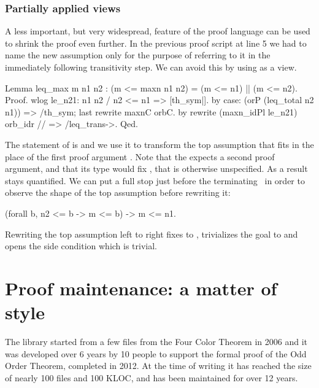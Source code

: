 \subsubsection{Partially applied views}

A less important, but very widespread, feature of the \mcbSSR{}
proof language can be used to shrink the proof even further.
In the previous proof script at line 5 we had to name 
the new assumption only for the
purpose of referring to it in the immediately following transitivity step.
We can avoid this by using  as a view.


\begin{coq}{}{}
Lemma leq_max m n1 n2 : (m <= maxn n1 n2) = (m <= n1) || (m <= n2).
Proof.
wlog le_n21: n1 n2 / n2 <= n1 => [th_sym|].
  by case: (orP (leq_total n2 n1)) => /th_sym; last rewrite maxnC orbC.
by rewrite (maxn_idPl le_n21) orb_idr // => /leq_trans->.
Qed.
\end{coq}

The statement of
 is  and
we use it to transform the top assumption  that fits in
the place of the first proof argument .  Note that
the  expects a second proof argument, and that its type
would fix , that is otherwise unspecified. As a result 
stays quantified. We can put a
full stop just before the terminating~ \C{->} in order to observe the shape of
the top assumption before rewriting it:

\begin{coq}{}{}
(forall b, n2 <= b -> m <= b) -> m <= n1.
\end{coq}

Rewriting the top assumption left to right fixes  to , trivializes
the goal  to  and opens the side
condition  which is trivial.

\section{Proof maintenance: a matter of style}

The \mcbMC{} library started from a few files from the Four Color
Theorem in 2006 and it was developed over 6 years by 10 people to
support the formal proof of the Odd Order Theorem, completed in 2012.
At the time of writing it has reached the size of nearly 100 files and
100 KLOC, and has been maintained for over 12 years.

